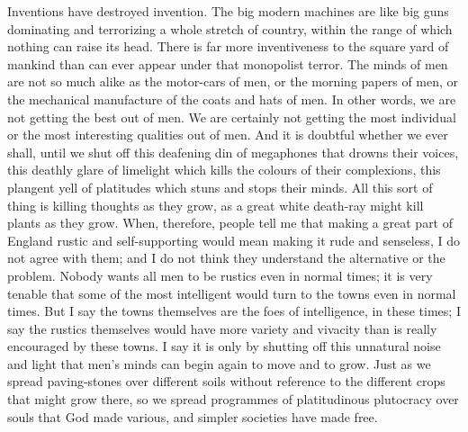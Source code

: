 \documentclass{book}
\begin{document}
Inventions have destroyed invention. The big modern machines are like big guns dominating and terrorizing a whole stretch of country, within the range of which nothing can raise its head. There is far more inventiveness to the square yard of mankind than can ever appear under that monopolist terror. The minds of men are not so much alike as the motor-cars of men, or the morning papers of men, or the mechanical manufacture of the coats and hats of men. In other words, we are not getting the best out of men. We are certainly not getting the most individual or the most interesting qualities out of men. And it is doubtful whether we ever shall, until we shut off this deafening din of megaphones that drowns their voices, this deathly glare of limelight which kills the colours of their complexions, this plangent yell of platitudes which stuns and stops their minds. All this sort of thing is killing thoughts as they grow, as a great white death-ray might kill plants as they grow. When, therefore, people tell me that making a great part of England rustic and self-supporting would mean making it rude and senseless, I do not agree with them; and I do not think they understand the alternative or the problem. Nobody wants all men to be rustics even in normal times; it is very tenable that some of the most intelligent would turn to the towns even in normal times. But I say the towns themselves are the foes of intelligence, in these times; I say the rustics themselves would have more variety and vivacity than is really encouraged by these towns. I say it is only by shutting off this unnatural noise and light that men’s minds can begin again to move and to grow. Just as we spread paving-stones over different soils without reference to the different crops that might grow there, so we spread programmes of platitudinous plutocracy over souls that God made various, and simpler societies have made free.
\end{document}

